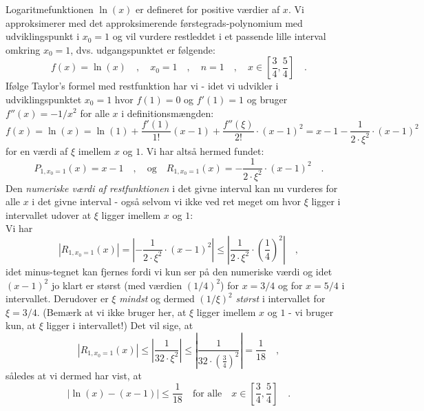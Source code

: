 \begin{example} \label{exampRestVurdering0}
Logaritmefunktionen $\ln(x)$ er defineret for positive værdier af $x$. Vi approksimerer med det approksimerende førstegrads-polynomium med udviklingspunkt i $x_{0}=1$ og vil vurdere restleddet i et passende lille interval omkring $x_{0}=1$, dvs. udgangspunktet er følgende:
\begin{equation}
f(x) = \ln(x) \quad , \quad x_{0}=1 \quad ,\quad  n = 1 \quad , \quad x \in \left[\frac{3}{4}, \frac{5}{4} \right] \quad .
\end{equation}
Ifølge Taylor's formel med restfunktion har vi - idet vi udvikler i udviklingspunktet $x_{0}=1$ hvor $f(1) = 0$ og $f'(1) = 1$ og bruger
$f''(x) = -1/x^{2}$ for alle $x$ i definitionsmængden:
\begin{equation}
f(x) = \ln(x) = \ln(1) + \frac{f'(1)}{1!}(x-1) + \frac{f''(\xi)}{2!}\cdot(x-1)^{2} = x-1 - \frac{1}{2\cdot \xi^{2}}\cdot (x-1)^{2}
\end{equation}
for en værdi af $\xi$ imellem $x$ og $1$.
Vi har altså hermed fundet:
\begin{equation}
P_{1,x_{0}=1}(x) = x-1 \quad , \quad \textrm{og} \quad R_{1, x_{0}=1}(x) = - \frac{1}{2\cdot \xi^{2}}\cdot (x-1)^{2} \quad.
\end{equation}
Den {\emph{numeriske værdi af restfunktionen}} i det givne interval kan nu vurderes for alle $x$ i det givne interval - også selvom vi ikke ved ret meget om hvor $\xi$ ligger i intervallet udover at $\xi$ ligger imellem $x$ og $1$:\\

Vi har
\begin{equation}
|R_{1, x_{0}=1}(x)| = |- \frac{1}{2\cdot \xi^{2}}\cdot (x-1)^{2}| \leq |\frac{1}{2\cdot \xi^{2}}\cdot \left(\frac{1}{4}\right)^{2}| \quad ,
\end{equation}
idet minus-tegnet kan fjernes fordi vi kun ser på den numeriske værdi og idet $(x-1)^{2}$ jo klart er størst (med værdien $(1/4)^{2}$) for $x=3/4$ og for $x=5/4$ i intervallet.
Derudover er $\xi$ {\emph{mindst}} og dermed $(1/\xi)^{2}$ {\emph{størst}} i intervallet for $\xi = 3/4$. (Bemærk at vi ikke bruger her, at $\xi$ ligger imellem $x$ og $1$ - vi bruger kun, at $\xi$ ligger i intervallet!)
Det vil sige, at
\begin{equation}
|R_{1, x_{0}=1}(x)| \leq |\frac{1}{32\cdot\xi^{2}}| \leq |\frac{1}{32\cdot\left(\frac{3}{4}\right)^{2}}| = \frac{1}{18} \quad,
\end{equation}
således at vi dermed har vist, at
\begin{equation}
|\ln(x) - (x-1)| \leq \frac{1}{18} \quad \textrm{for alle} \quad x \in \left[\frac{3}{4}, \frac{5}{4} \right] \quad .
\end{equation}
\end{example}


